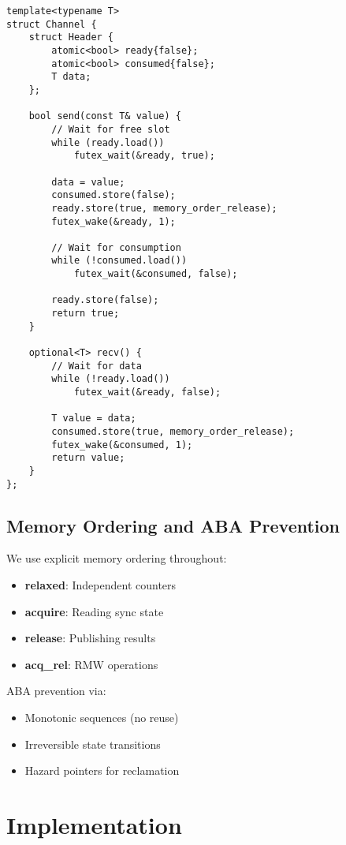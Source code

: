 \documentclass[sigconf,anonymous]{acmart}
\begin{document}
\begin{lstlisting}[caption={Unbuffered Channel Rendezvous}]
template<typename T>
struct Channel {
    struct Header {
        atomic<bool> ready{false};
        atomic<bool> consumed{false};
        T data;
    };
    
    bool send(const T& value) {
        // Wait for free slot
        while (ready.load())
            futex_wait(&ready, true);
            
        data = value;
        consumed.store(false);
        ready.store(true, memory_order_release);
        futex_wake(&ready, 1);
        
        // Wait for consumption
        while (!consumed.load())
            futex_wait(&consumed, false);
            
        ready.store(false);
        return true;
    }
    
    optional<T> recv() {
        // Wait for data
        while (!ready.load())
            futex_wait(&ready, false);
            
        T value = data;
        consumed.store(true, memory_order_release);
        futex_wake(&consumed, 1);
        return value;
    }
};
\end{lstlisting}

\subsection{Memory Ordering and ABA Prevention}

We use explicit memory ordering throughout:

\begin{itemize}
\item \textbf{relaxed}: Independent counters
\item \textbf{acquire}: Reading sync state
\item \textbf{release}: Publishing results
\item \textbf{acq\_rel}: RMW operations
\end{itemize}

ABA prevention via:
\begin{itemize}
\item Monotonic sequences (no reuse)
\item Irreversible state transitions
\item Hazard pointers for reclamation
\end{itemize}

\section{Implementation}
\end{document}
